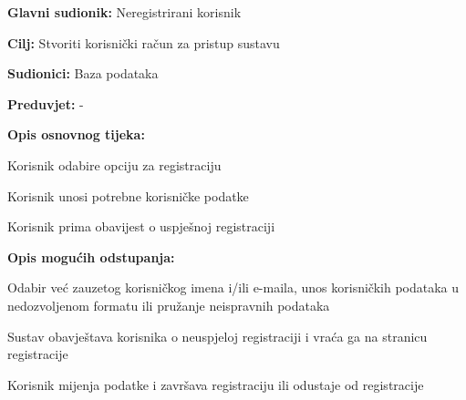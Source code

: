 				\noindent {}
					\begin{packed_item}
	
						\item \textbf{Glavni sudionik: }Neregistrirani korisnik
						\item  \textbf{Cilj:} Stvoriti korisnički račun za pristup sustavu
						\item  \textbf{Sudionici:} Baza podataka
						\item  \textbf{Preduvjet:} -
						\item  \textbf{Opis osnovnog tijeka:}
						
						\item[] \begin{packed_enum}
	
							\item Korisnik odabire opciju za registraciju
							\item Korisnik unosi potrebne korisničke podatke
							\item Korisnik prima obavijest o uspješnoj registraciji

						\end{packed_enum}
						
						\item  \textbf{Opis mogućih odstupanja:}
						
						\item[] \begin{packed_item}
	
							\item[2.a] Odabir već zauzetog korisničkog imena i/ili e-maila, unos korisničkih podataka u nedozvoljenom formatu ili pružanje neispravnih podataka
							
								\begin{packed_item}
								
									\item Sustav obavještava korisnika o neuspjeloj registraciji i vraća ga na stranicu registracije
									\item Korisnik mijenja podatke i završava registraciju ili odustaje od registracije
								
								\end{packed_item}
							
						\end{packed_item}					
					\end{packed_item}
					
